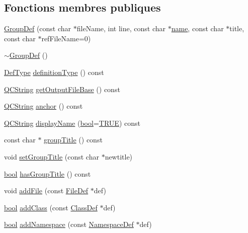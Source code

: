 \subsection*{Fonctions membres publiques}
\begin{DoxyCompactItemize}
\item 
\hyperlink{class_group_def_a38cde7c40f0b6089b99efa85629b6da8}{Group\+Def} (const char $\ast$file\+Name, int line, const char $\ast$\hyperlink{class_definition_a99481361779e85f0c1556709de7d9e5b}{name}, const char $\ast$title, const char $\ast$ref\+File\+Name=0)
\item 
\hyperlink{class_group_def_aceab554034ffb309941faafd76a84bcd}{$\sim$\+Group\+Def} ()
\item 
\hyperlink{class_definition_intf_ada60114bc621669dd8c19edfc6421766}{Def\+Type} \hyperlink{class_group_def_a75fbb5366abdbbc1ef90f964abeea55f}{definition\+Type} () const 
\item 
\hyperlink{class_q_c_string}{Q\+C\+String} \hyperlink{class_group_def_a67914ef80cfb1958b5b5f36b13866b83}{get\+Output\+File\+Base} () const 
\item 
\hyperlink{class_q_c_string}{Q\+C\+String} \hyperlink{class_group_def_aa294001ba3e3fd87339f24124b46a02e}{anchor} () const 
\item 
\hyperlink{class_q_c_string}{Q\+C\+String} \hyperlink{class_group_def_a587ccab5939fb33a5630fdadaf0a271d}{display\+Name} (\hyperlink{qglobal_8h_a1062901a7428fdd9c7f180f5e01ea056}{bool}=\hyperlink{qglobal_8h_a04a6422a52070f0dc478693da640242b}{T\+R\+U\+E}) const 
\item 
const char $\ast$ \hyperlink{class_group_def_a8844b0f43a5861f69ff36551400a6605}{group\+Title} () const 
\item 
void \hyperlink{class_group_def_a0a3c458b0cb95ce838ba7ba9b120ff26}{set\+Group\+Title} (const char $\ast$newtitle)
\item 
\hyperlink{qglobal_8h_a1062901a7428fdd9c7f180f5e01ea056}{bool} \hyperlink{class_group_def_ac873bd7e6c74e6a6f40aff47308cdf07}{has\+Group\+Title} () const 
\item 
void \hyperlink{class_group_def_a9a676ba60547c855e012529a1123e1bf}{add\+File} (const \hyperlink{class_file_def}{File\+Def} $\ast$def)
\item 
\hyperlink{qglobal_8h_a1062901a7428fdd9c7f180f5e01ea056}{bool} \hyperlink{class_group_def_a20aabb4f8669ea993290f1cd79c841f1}{add\+Class} (const \hyperlink{class_class_def}{Class\+Def} $\ast$def)
\item 
\hyperlink{qglobal_8h_a1062901a7428fdd9c7f180f5e01ea056}{bool} \hyperlink{class_group_def_a4f4ce1086bd99c08ee4fd20537729bdb}{add\+Namespace} (const \hyperlink{class_namespace_def}{Namespace\+Def} $\ast$def)

\end{DoxyCompactItemize}
